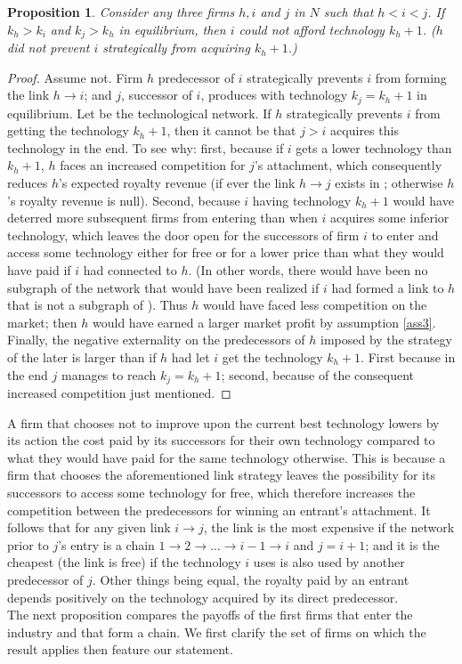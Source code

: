 \documentclass{article}
\newtheorem{proposition}{Proposition}
\begin{document}
\begin{proposition}
Consider any three firms $h,i$ and $j$ in $N$ such that $h<i<j$. If $k_h>k_i$ and $k_j>k_h$ in equilibrium, then $i$ could not afford technology $k_h+1$. ($h$ did not prevent $i$ strategically from acquiring $k_h+1$.)
\end{proposition}
\begin{proof}
Assume not. Firm $h$ predecessor of $i$ strategically prevents $i$ from forming the link $h\rightarrow i$; and $j$, successor of $i$, produces with technology $k_j=k_h+1$ in equilibrium. Let  be the technological network. If $h$ strategically prevents $i$ from getting the technology $k_h+1$, then it cannot be that $j>i$ acquires this technology in the end. To see why: first, because if $i$ gets a lower technology than $k_h+1$, $h$ faces an increased competition for $j$'s attachment, which consequently reduces $h$'s expected royalty revenue (if ever the link $h\rightarrow j$ exists in ; otherwise $h$'s royalty revenue is null). Second, because $i$ having technology $k_h+1$ would have deterred more subsequent firms from entering than when $i$ acquires some inferior technology, which leaves the door open for the successors of firm $i$ to enter and access some technology either for free or for a lower price than what they would have paid if $i$ had connected to $h$. (In other words, there would have been no subgraph of the network that would have been realized if $i$ had formed a link to $h$ that is not a subgraph of ). Thus $h$ would have faced less competition on the market; then $h$ would have earned a larger market profit by assumption \ref{ass3}. Finally, the negative externality on the predecessors of $h$ imposed by the strategy of the later is larger than if $h$ had let $i$ get the technology $k_h+1$. First because in the end $j$ manages to reach $k_j=k_h+1$; second, because of the consequent increased competition just mentioned.   
\end{proof}

A firm that chooses not to improve upon the current best technology lowers by its action the cost paid by its successors for their own technology compared to what they would have paid for the same technology otherwise. This is because a firm that chooses the aforementioned link strategy leaves the possibility for its successors to access some technology for free, which therefore increases the competition between the predecessors for winning an entrant's attachment. It follows that for any given link $i\rightarrow j$, the link is the most expensive if the network prior to $j$'s entry is a chain $1\rightarrow 2\rightarrow \ldots \rightarrow i-1\rightarrow i$ and $j=i+1$; and it is the cheapest (the link is free) if the technology $i$ uses is also used by another predecessor of $j$. Other things being equal, the royalty paid by an entrant depends positively on the technology acquired by its direct predecessor. \\
\indent The next proposition compares the payoffs of the first firms that enter the industry and that form a chain. We first clarify the set of firms on which the result applies then feature our statement. \\
\end{document}
